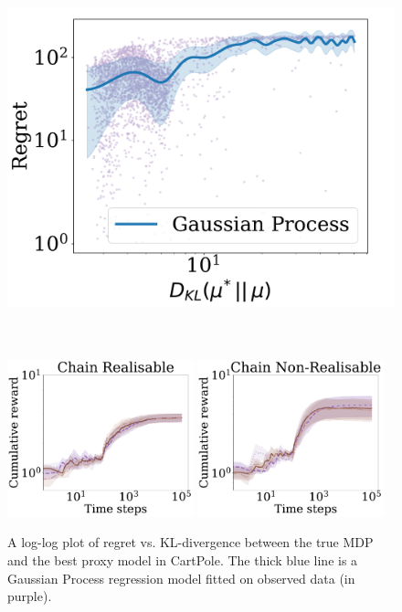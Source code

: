 \begin{figure}[t!]
\centering
    \begin{minipage}{0.34\textwidth}
    \centering
    \includegraphics[width=\textwidth]{img/alpha_norms}\\~\\~\\
    \caption{A log-log plot of regret vs. KL-divergence between the true MDP and the best proxy model in CartPole. The thick blue line is a Gaussian Process regression model fitted on observed data (in purple).}\label{fig:norms}%
    \end{minipage}\hfill
    \begin{minipage}{0.65\textwidth}
    \centering
    \includegraphics[width=0.48\textwidth]{img/chain_meta_realisable.pdf} 
    \includegraphics[width=0.48\textwidth]{img/chain_meta_non_realisable.pdf}\\

\end{minipage}
\end{figure}
